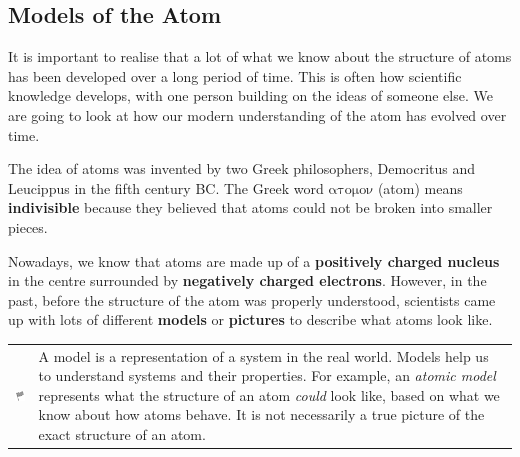             \subsection{ Models of the Atom}
            \nopagebreak
      \label{m38756*id254164}It is important to realise that a lot of what we know about the structure of atoms has been developed over a long period of time. This is often how scientific knowledge develops, with one person building on the ideas of someone else. We are going to look at how our modern understanding of the atom has evolved over time.\par 
      \label{m38756*id254508}The idea of atoms was invented by two Greek philosophers, Democritus and Leucippus in the fifth century BC. The Greek word $\mathrm{\alpha \tau o\mu o\nu }$ \hspace{1ex} (atom) means \textbf{indivisible} because they believed that atoms could not be broken into smaller pieces.\par 
      \label{m38756*id254540}Nowadays, we know that atoms are made up of a \textbf{positively charged nucleus} in the centre
surrounded by \textbf{negatively charged electrons}. However, in the past, before the structure of the atom was properly understood, scientists came up with lots of different \textbf{models} or \textbf{pictures} to describe what atoms look like.\par 
\label{m38756*fhsst!!!underscore!!!id72}\begin{definition}
	  \begin{tabular*}{15 cm}{m{15 mm}m{}}
	\hspace*{-50pt}  \includegraphics[width=0.5in]{col11305.imgs/psflag2.png}   & \Definition{   \label{id2414493}\textbf{ Model }} { \label{m38756*meaningfhsst!!!underscore!!!id72}
      \label{m38756*id254584}A model is a representation of a system in the real world. Models help us to understand systems and their properties. For example, an \textsl{atomic model} represents what the structure of an atom \textsl{could} look like, based on what we know about how atoms behave. It is not necessarily a true picture of the exact structure of an atom. \par 
       } 
      \end{tabular*}
      \end{definition}
      \label{m38756*uid1}
